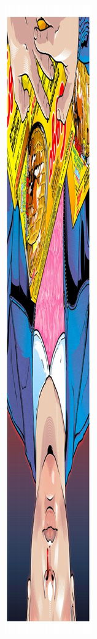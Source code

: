 \documentclass[12pt, a4paper]{article}
\begin{document}
\begin{figure}[h!]
\begin{minipage}[h!]{0.3\linewidth}
\end{minipage}
\hfill
\begin{minipage}[h!]{0.3\linewidth} 
\includegraphics[width=0.8\linewidth, height=0.21\textheight, angle=180]{pop2.pdf}

\end{minipage}
\end{figure}
\end{document}

